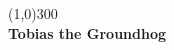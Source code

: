 \documentclass{article}
\begin{document}
\begin{titlepage}
	\begin{center}
	\line(1,0){300} \\
	\huge{\bfseries Tobias the Groundhog}
	\end{center}
\end{titlepage}
\end{document}
